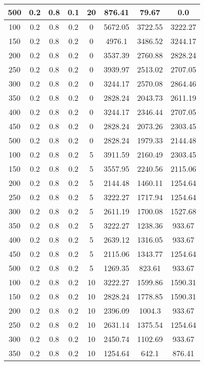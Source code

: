 \documentclass[a4paper, 12pt]{extreport}
\begin{document}
\begin{itemize}
\begin{longtable}{|c|c|c|c|c|c|c|c|}
			500 & 0.2 & 0.8 & 0.1 & 20 & 876.41 & 79.67 & 0.0 \\\hline
			100 & 0.2 & 0.8 & 0.2 & 0 & 5672.05 & 3722.55 & 3222.27 \\\hline
			150 & 0.2 & 0.8 & 0.2 & 0 & 4976.1 & 3486.52 & 3244.17 \\\hline
			200 & 0.2 & 0.8 & 0.2 & 0 & 3537.39 & 2760.88 & 2828.24 \\\hline
			250 & 0.2 & 0.8 & 0.2 & 0 & 3939.97 & 2513.02 & 2707.05 \\\hline
			300 & 0.2 & 0.8 & 0.2 & 0 & 3244.17 & 2570.08 & 2864.46 \\\hline
			350 & 0.2 & 0.8 & 0.2 & 0 & 2828.24 & 2043.73 & 2611.19 \\\hline
			400 & 0.2 & 0.8 & 0.2 & 0 & 3244.17 & 2346.44 & 2707.05 \\\hline
			450 & 0.2 & 0.8 & 0.2 & 0 & 2828.24 & 2073.26 & 2303.45 \\\hline
			500 & 0.2 & 0.8 & 0.2 & 0 & 2828.24 & 1979.33 & 2144.48 \\\hline
			100 & 0.2 & 0.8 & 0.2 & 5 & 3911.59 & 2160.49 & 2303.45 \\\hline
			150 & 0.2 & 0.8 & 0.2 & 5 & 3557.95 & 2240.56 & 2115.06 \\\hline
			200 & 0.2 & 0.8 & 0.2 & 5 & 2144.48 & 1460.11 & 1254.64 \\\hline
			250 & 0.2 & 0.8 & 0.2 & 5 & 3222.27 & 1717.94 & 1254.64 \\\hline
			300 & 0.2 & 0.8 & 0.2 & 5 & 2611.19 & 1700.08 & 1527.68 \\\hline
			350 & 0.2 & 0.8 & 0.2 & 5 & 3222.27 & 1238.36 & 933.67 \\\hline
			400 & 0.2 & 0.8 & 0.2 & 5 & 2639.12 & 1316.05 & 933.67 \\\hline
			450 & 0.2 & 0.8 & 0.2 & 5 & 2115.06 & 1343.77 & 1254.64 \\\hline
			500 & 0.2 & 0.8 & 0.2 & 5 & 1269.35 & 823.61 & 933.67 \\\hline
			100 & 0.2 & 0.8 & 0.2 & 10 & 3222.27 & 1599.86 & 1590.31 \\\hline
			150 & 0.2 & 0.8 & 0.2 & 10 & 2828.24 & 1778.85 & 1590.31 \\\hline
			200 & 0.2 & 0.8 & 0.2 & 10 & 2396.09 & 1004.3 & 933.67 \\\hline
			250 & 0.2 & 0.8 & 0.2 & 10 & 2631.14 & 1375.54 & 1254.64 \\\hline
			300 & 0.2 & 0.8 & 0.2 & 10 & 2450.74 & 1102.69 & 933.67 \\\hline
			350 & 0.2 & 0.8 & 0.2 & 10 & 1254.64 & 642.1 & 876.41 \\\hline

\end{longtable}
\end{itemize}
\end{document}
